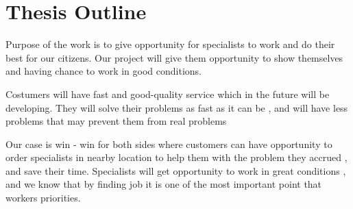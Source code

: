 \section{Thesis Outline}
\hspace{7mm}Purpose of the work is to give opportunity for specialists to work and do their best for our citizens. Our project will give them opportunity to show themselves and having chance to work in good conditions.


Costumers will have fast and good-quality service which in the future will be developing. They will solve their problems as fast as it can be , and will have less problems that may prevent them from real problems


Our case is win - win for both sides where customers can have opportunity to order specialists in nearby location to help them with the problem they accrued , and save their time. Specialists will get opportunity to work in great conditions , and we know that by finding job it is one of the most important point that workers priorities.

